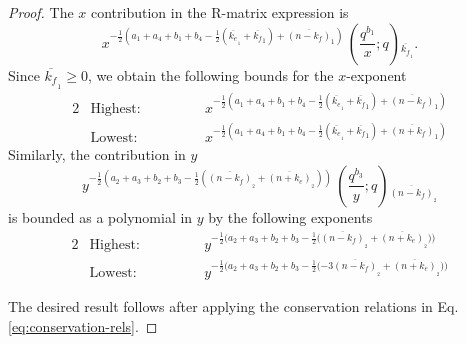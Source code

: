 \documentclass[10pt,a4paper]{amsart}
\begin{document}
\begin{proof}

The $x$ contribution in the R-matrix expression is
\begin{equation*}
    x^{-\frac{1}{2}(a_1+a_4+b_1+b_4-\frac{1}{2}(\overline{k_e}_{{}_1}+\overline{k_f}_{1})+\overline{(n-k_f)}_{1})} \, \left(\frac{q^{ b_1}}{x};q\right){}_{\overline{k_f}_{{}_1}}.
\end{equation*}
Since $\overline{k_f}_{{}_1} \geq 0$, we obtain the following bounds for the $x$-exponent
\begin{alignat*}{2}
    &\text{Highest:} \hspace{3em} &&x^{-\frac{1}{2}(a_1+a_4+b_1+b_4-\frac{1}{2}(\overline{k_e}_{{}_1}+\overline{k_f}_{1})+\overline{(n-k_f)}_{1})} \\
    &\text{Lowest:} \hspace{3em} &&x^{-\frac{1}{2}(a_1+a_4+b_1+b_4-\frac{1}{2}(\overline{k_e}_{{}_1}+\overline{k_f}_{1})+\overline{(n+k_f)}_{1})}
\end{alignat*}
Similarly, the contribution in $y$
\begin{equation*}
    y^{-\frac{1}{2}(a_2+a_3+b_2+b_3-\frac{1}{2}(\overline{(n-k_f)}_{{}_2}+\overline{(n+k_e)}_{{}_2}))} \, \left(\frac{q^{b_3}}{y};q\right){}_{\overline{(n-k_{f})}_{{}_2}}
\end{equation*}
is bounded as a polynomial in $y$ by the following exponents
\begin{alignat*}{2}
    &\text{Highest:} \hspace{3em} &&y^{-\frac{1}{2}(a_2+a_3+b_2+b_3-\frac12({\overline{(n-k_f)}_{{}_2}+\overline{(n+k_e)}_{{}_2}))}} \\
    &\text{Lowest:} \hspace{3em} &&y^{-\frac{1}{2}(a_2+a_3+b_2+b_3-\frac12(-3{\overline{(n-k_f)}_{{}_2}+\overline{(n+k_e)}_{{}_2}))}}
\end{alignat*}

The desired result follows after applying the conservation relations in Eq. \eqref{eq:conservation-rels}.
\end{proof}
\end{document}
